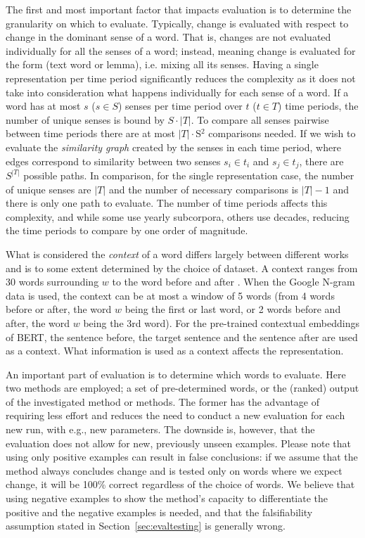\documentclass[output=paper]{langsci/langscibook}
\begin{document}
    
The first and most important factor that impacts evaluation is to determine the granularity on which to evaluate. Typically, change is evaluated with respect to change in the dominant sense of a word. That is, changes are not evaluated individually for all the senses of a word; instead, meaning change is evaluated for the form (text word or lemma), i.e. mixing all its senses. 
    Having a single representation per time period significantly reduces the complexity as it does not take into consideration what happens individually for each sense of a word. If a word has at most $s$ ($s\in S$) senses per time period over $t$ ($t \in T$) time periods, the number of unique senses is bound by $S\cdot |T|$. To compare all senses pairwise between time periods there are at most $|T|\cdot$S$^2$ comparisons needed. If we wish to evaluate the \textit{similarity graph} created by the senses in each time period, where edges correspond to similarity between two senses $s_i \in t_i$ and $s_j \in t_j$, there are $S^{|T|}$ possible paths. In comparison, for the single representation case, the number of unique senses are $|T|$ and the number of necessary comparisons is $|T|-1$  
    and there is only one path to evaluate. The number of time periods affects this complexity, and while some use yearly subcorpora, others use decades, reducing the time periods to compare by one order of magnitude. 
    
    
What is considered the \textit{context} of a word differs largely between different works and is to some extent determined by the choice of dataset. A context ranges from 30 words surrounding $w$ \citep{sagi-etal-2009-semantic} to the word before and after \citep{gulordava-baroni-2011-distributional}. When the Google N-gram data is used, the context can be at most a window of 5 words (from 4 words before or after, the word $w$ being the first or last word, or 2 words before and after, the word $w$ being the 3rd word). For the pre-trained contextual embeddings of BERT, the sentence before, the target sentence and the sentence after are used as a context. What information is used as a context affects the representation. 

An important part of evaluation is to determine which words to evaluate. Here two methods are employed; a set of pre-determined words, or the (ranked) output of the investigated method or methods.
	The former has the advantage of requiring less effort and reduces the need to conduct a new evaluation for each new run, with e.g., new parameters. The downside is, however, that the evaluation does not allow for new, previously unseen examples. Please note that using only positive examples can result in false conclusions: if we assume that the method always concludes change and is tested only on words where we expect change, it will be 100\% correct regardless of the choice of words. We believe that using negative examples to show the method's capacity to differentiate the positive and the negative examples is needed, and that the falsifiability assumption stated in Section~\ref{sec:evaltesting} is generally wrong.   
	
\end{document}
